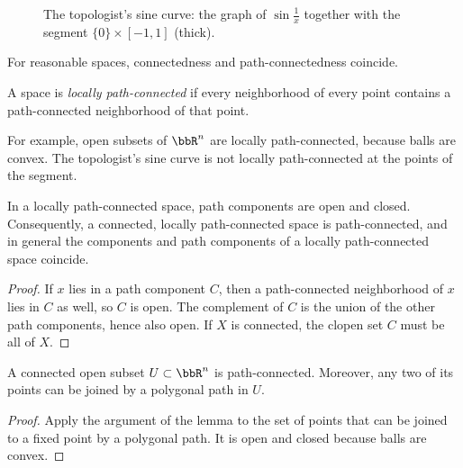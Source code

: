 \begin{figure}[tp]
    \centering
    \caption{The topologist's sine curve: the graph of $\sin\frac1x$ together with the segment $\{0\}\times[-1,1]$ (thick).}
    \label{tsine}
\end{figure}

For reasonable spaces, connectedness and path-connectedness coincide.

\begin{defn}
    A space is \emph{locally path-connected} if every neighborhood of every point contains a path-connected neighborhood of that point.
\end{defn}

For example, open subsets of $\bbR^n$ are locally path-connected, because balls are convex. The topologist's sine curve is not locally path-connected at the points of the segment.

\begin{lem}\label{lem locally path connected}
    In a locally path-connected space, path components are open and closed. Consequently, a connected, locally path-connected space is path-connected, and in general the components and path components of a locally path-connected space coincide.
\end{lem}
\begin{proof}
    If $x$ lies in a path component $C$, then a path-connected neighborhood of $x$ lies in $C$ as well, so $C$ is open. The complement of $C$ is the union of the other path components, hence also open. If $X$ is connected, the clopen set $C$ must be all of $X$.
\end{proof}

\begin{cor}\label{cor open connected Rn}
    A connected open subset $U\subset\bbR^n$ is path-connected. Moreover, any two of its points can be joined by a polygonal path in $U$.
\end{cor}
\begin{proof}
    Apply the argument of the lemma to the set of points that can be joined to a fixed point by a polygonal path. It is open and closed because balls are convex.
\end{proof}

